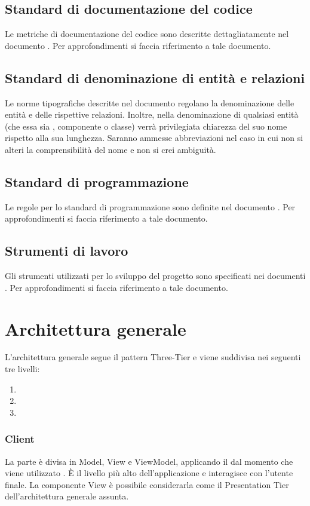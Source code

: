 \documentclass[a4paper, titlepage]{article}
\begin{document}
	\subsection{Standard di documentazione del codice}
	Le metriche di documentazione del codice sono descritte dettagliatamente nel documento . Per approfondimenti si faccia riferimento a tale documento.
	\subsection{Standard di denominazione di entità e relazioni}
	Le norme tipografiche descritte nel documento  regolano la denominazione
	delle entità e delle rispettive relazioni. Inoltre, nella denominazione di qualsiasi entità (che essa sia
	, componente o classe) verrà privilegiata chiarezza del suo nome rispetto alla sua lunghezza.
	Saranno ammesse abbreviazioni nel caso in cui non si alteri la comprensibilità del nome e non si
	crei ambiguità.
	\subsection{Standard di programmazione}
	Le regole per lo standard di programmazione sono definite nel documento . Per approfondimenti si faccia riferimento a tale documento.
	\subsection{Strumenti di lavoro}
	Gli strumenti utilizzati per lo sviluppo del progetto sono specificati nei documenti . Per approfondimenti si faccia riferimento a tale documento.

\newpage
\section{Architettura generale}
	L'architettura generale segue il pattern Three-Tier e viene suddivisa nei seguenti tre livelli:
	\begin{enumerate}
		\item {} 
		\item {} 
		\item {}
	\end{enumerate}
	
	\subsubsection{Client}
	La parte  è divisa in Model, View e ViewModel, applicando il   dal momento che viene utilizzato . È il livello più alto dell'applicazione e interagisce con l'utente finale. La componente View è possibile considerarla come il Presentation Tier dell'architettura generale assunta.
	
\end{document}
